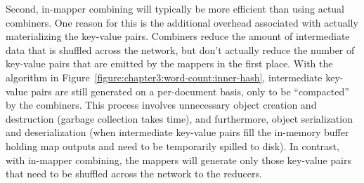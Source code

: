Second, in-mapper combining will typically be more efficient than
using actual combiners.  One reason for this is the additional
overhead associated with actually materializing the key-value pairs.
Combiners reduce the amount of intermediate data that is shuffled
across the network, but don't actually reduce the number of key-value
pairs that are emitted by the mappers in the first place.  With the
algorithm in Figure~\ref{figure:chapter3:word-count:inner-hash},
intermediate key-value pairs are still generated on a per-document
basis, only to be ``compacted'' by the combiners.  This process
involves unnecessary object creation and destruction (garbage
collection takes time), and furthermore, object serialization and
deserialization (when intermediate key-value pairs fill the in-memory
buffer holding map outputs and need to be temporarily spilled to
disk). In contrast, with in-mapper combining, the mappers will
generate only those key-value pairs that need to be shuffled across
the network to the reducers.


